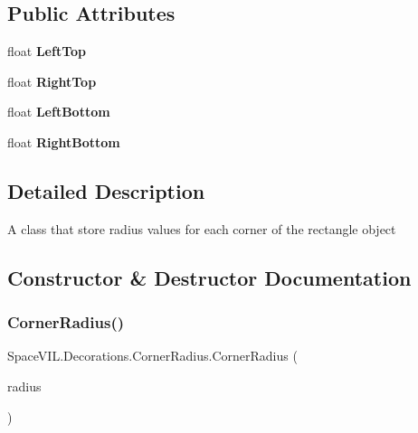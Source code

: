 \subsection*{Public Attributes}
\begin{DoxyCompactItemize}
\item 
\mbox{\label{class_space_v_i_l_1_1_decorations_1_1_corner_radius_a245fa87a1e61e48df633b9e683257e2d}} 
float {\bfseries Left\+Top}
\item 
\mbox{\label{class_space_v_i_l_1_1_decorations_1_1_corner_radius_a33def3bbda9509de1d24d4538ea1cca6}} 
float {\bfseries Right\+Top}
\item 
\mbox{\label{class_space_v_i_l_1_1_decorations_1_1_corner_radius_a4f78c1c3483160b8bad0d86db905bdac}} 
float {\bfseries Left\+Bottom}
\item 
\mbox{\label{class_space_v_i_l_1_1_decorations_1_1_corner_radius_ac0ae03b307069eb2c649b60573826c07}} 
float {\bfseries Right\+Bottom}
\end{DoxyCompactItemize}


\subsection{Detailed Description}
A class that store radius values for each corner of the rectangle object 



\subsection{Constructor \& Destructor Documentation}
\mbox{\label{class_space_v_i_l_1_1_decorations_1_1_corner_radius_ada9a5a6f3e04d10e5ea65ffa6692b61c}} 
\subsubsection{\texorpdfstring{Corner\+Radius()}{CornerRadius()}\hspace{0.1cm}{\footnotesize\ttfamily [1/3]}}
{\footnotesize\ttfamily Space\+V\+I\+L.\+Decorations.\+Corner\+Radius.\+Corner\+Radius (\begin{DoxyParamCaption}\item[{\mbox{\hyperlink{class_space_v_i_l_1_1_decorations_1_1_corner_radius}{Corner\+Radius}}}]{radius }\end{DoxyParamCaption})}



